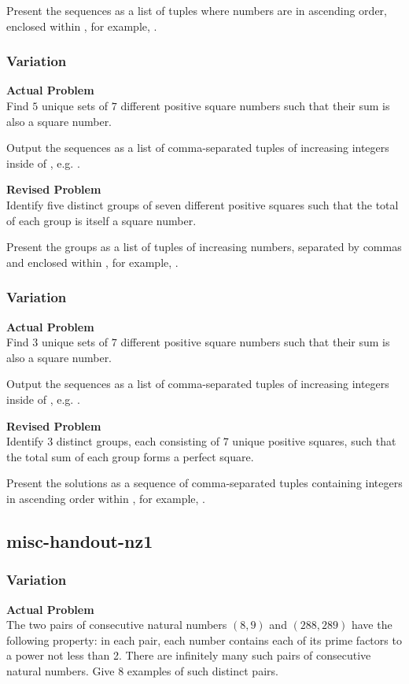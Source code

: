 Present the sequences as a list of tuples where numbers are in ascending order, enclosed within \boxed, for example, .

\subsubsection{Variation}
\textbf{Actual Problem}\\
Find $5$ unique sets of $7$ different positive square numbers such that their sum is also a square number.

Output the sequences as a list of comma-separated tuples of increasing integers inside of \boxed, e.g. .

\textbf{Revised Problem}\\
Identify five distinct groups of seven different positive squares such that the total of each group is itself a square number.

Present the groups as a list of tuples of increasing numbers, separated by commas and enclosed within \boxed, for example, .

\subsubsection{Variation}
\textbf{Actual Problem}\\
Find $3$ unique sets of $7$ different positive square numbers such that their sum is also a square number.

Output the sequences as a list of comma-separated tuples of increasing integers inside of \boxed, e.g. .

\textbf{Revised Problem}\\
Identify $3$ distinct groups, each consisting of $7$ unique positive squares, such that the total sum of each group forms a perfect square.

Present the solutions as a sequence of comma-separated tuples containing integers in ascending order within \boxed, for example, .

\subsection{misc-handout-nz1}
\subsubsection{Variation}
\textbf{Actual Problem}\\
The two pairs of consecutive natural numbers $(8,9)$ and $(288,289)$ have the following property: in each pair, each number contains each of its prime factors to a power not less than 2. There are infinitely many such pairs of consecutive natural numbers. 
Give 8 examples of such distinct pairs.

